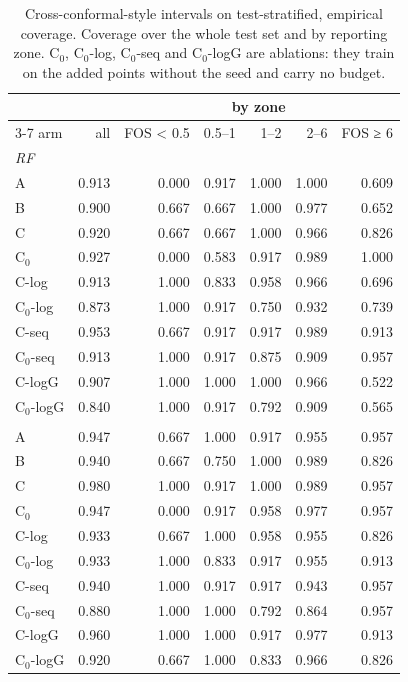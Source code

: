\begin{table}[htbp]
\centering
\caption{Cross-conformal-style intervals on test-stratified, empirical coverage. Coverage over the whole test set and by reporting zone. C$_0$, C$_0$-log, C$_0$-seq and C$_0$-logG are ablations: they train on the added points without the seed and carry no budget.}
\label{tab:test-stratified__fos-rmse:conformal}
\begin{tabular}{lrrrrrr}
\toprule
 &  & \multicolumn{5}{c}{by zone} \\
\cmidrule(lr){3-7}
arm & all & FOS < 0.5 & 0.5–1 & 1–2 & 2–6 & FOS ≥ 6 \\
\midrule
\multicolumn{7}{l}{\textit{RF}} \\
A & 0.913 & 0.000 & 0.917 & 1.000 & 1.000 & 0.609 \\
B & 0.900 & 0.667 & 0.667 & 1.000 & 0.977 & 0.652 \\
C & 0.920 & 0.667 & 0.667 & 1.000 & 0.966 & 0.826 \\
C$_0$ & 0.927 & 0.000 & 0.583 & 0.917 & 0.989 & 1.000 \\
C-log & 0.913 & 1.000 & 0.833 & 0.958 & 0.966 & 0.696 \\
C$_0$-log & 0.873 & 1.000 & 0.917 & 0.750 & 0.932 & 0.739 \\
C-seq & 0.953 & 0.667 & 0.917 & 0.917 & 0.989 & 0.913 \\
C$_0$-seq & 0.913 & 1.000 & 0.917 & 0.875 & 0.909 & 0.957 \\
C-logG & 0.907 & 1.000 & 1.000 & 1.000 & 0.966 & 0.522 \\
C$_0$-logG & 0.840 & 1.000 & 0.917 & 0.792 & 0.909 & 0.565 \\
\addlinespace
\multicolumn{7}{l}{\textit{GBM}} \\
A & 0.947 & 0.667 & 1.000 & 0.917 & 0.955 & 0.957 \\
B & 0.940 & 0.667 & 0.750 & 1.000 & 0.989 & 0.826 \\
C & 0.980 & 1.000 & 0.917 & 1.000 & 0.989 & 0.957 \\
C$_0$ & 0.947 & 0.000 & 0.917 & 0.958 & 0.977 & 0.957 \\
C-log & 0.933 & 0.667 & 1.000 & 0.958 & 0.955 & 0.826 \\
C$_0$-log & 0.933 & 1.000 & 0.833 & 0.917 & 0.955 & 0.913 \\
C-seq & 0.940 & 1.000 & 0.917 & 0.917 & 0.943 & 0.957 \\
C$_0$-seq & 0.880 & 1.000 & 1.000 & 0.792 & 0.864 & 0.957 \\
C-logG & 0.960 & 1.000 & 1.000 & 0.917 & 0.977 & 0.913 \\
C$_0$-logG & 0.920 & 0.667 & 1.000 & 0.833 & 0.966 & 0.826 \\
\bottomrule
\end{tabular}
\end{table}
